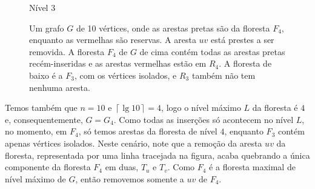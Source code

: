 \begin{figure}[H]
\begin{minipage}[c]{0.8\textwidth}
\begin{tikzpicture}
        \end{tikzpicture}
    \end{minipage}
    \vspace{1cm}
        \noindent
    \begin{minipage}[c]{2cm}
        \raggedright
        Nível $3$
    \end{minipage}%
    \begin{minipage}[c]{0.8\textwidth}
        \centering
    \end{minipage}
    \caption{Um grafo $G$ de 10 vértices, onde as arestas pretas são da floresta $F_4$, enquanto as vermelhas são reservas. A aresta $uv$ está prestes a ser removida. A floresta $F_{4}$ de $G$ de cima contém todas as arestas pretas recém-inseridas e as arestas vermelhas estão em $R_4$. A floresta de baixo é a $F_{3}$, com os vértices isolados, e $R_3$ também não tem nenhuma aresta.}
    \vspace{-1cm}
    \label{fig:example-replacement1}
\end{figure}

\raggedbottom

Temos também que $n = 10$ e $\left\lceil \lg 10 \right\rceil = 4$, logo o nível máximo $L$ da floresta é $4$ e,  consequentemente, $G = G_4$. Como todas as inserções só acontecem no nível $L$, no momento, em $F_4$, só temos arestas da floresta de nível $4$, enquanto $F_3$ contém apenas vértices isolados. Neste cenário, note que a remoção da aresta $uv$ da floresta, representada por uma linha tracejada na figura, acaba quebrando a única componente da floresta $F_4$ em duas, $T_u$ e $T_v$. Como $F_4$ é a floresta maximal de nível máximo de $G$, então removemos somente a $uv$ de $F_4$. 

